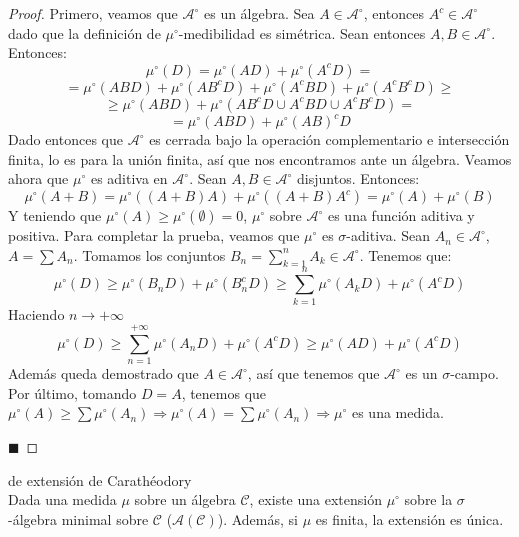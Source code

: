 \documentclass[12pt,a4paper]{book}
\newcommand*{\qed}{\hfill\ensuremath{\blacksquare}}
\begin{document}
\begin{proof}
Primero, veamos que $\mathcal{A}^\circ$ es un álgebra. Sea $A \in \mathcal{A}^\circ$, entonces $A^c \in \mathcal{A}^\circ$ dado que la definición de $\mu^\circ$-medibilidad es simétrica. Sean entonces $A,B \in \mathcal{A}^\circ$. Entonces:
$$ \mu^\circ(D) = \mu^\circ(AD) + \mu^\circ(A^cD) = $$
$$ = \mu^\circ(ABD) + \mu^\circ(AB^cD) + \mu^\circ(A^cBD) + \mu^\circ(A^cB^cD) \geq$$
$$ \geq \mu^\circ(ABD) + \mu^\circ (AB^cD \cup A^cBD \cup A^cB^cD) =$$
$$ = \mu^\circ(ABD) + \mu^\circ(AB)^cD$$
Dado entonces que $\mathcal{A}^\circ$ es cerrada bajo la operación complementario e intersección finita, lo es para la unión finita, así que nos encontramos ante un álgebra. Veamos ahora que $\mu^\circ$ es aditiva en $\mathcal{A}^\circ$. Sean $A,B \in \mathcal{A}^\circ$ disjuntos. Entonces:
$$\mu^\circ(A+B) = \mu^\circ((A+B)A) + \mu^\circ((A+B)A^c) = \mu^\circ(A) + \mu^\circ(B)$$
Y teniendo que $\mu^\circ(A) \geq \mu^\circ(\emptyset) = 0$, $\mu^\circ$ sobre $\mathcal{A}^\circ$ es una función aditiva y positiva. Para completar la prueba, veamos que $\mu^\circ$ es $\sigma$-aditiva. Sean $A_n \in \mathcal{A}^\circ$, $A = \displaystyle \sum A_n$. Tomamos los conjuntos $B_n = \displaystyle \sum_{k=1}^n A_k \in \mathcal{A}^\circ$. Tenemos que:
$$ \mu^\circ(D) \geq \mu^\circ (B_nD) + \mu^\circ (B_n^cD) \geq \sum_{k=1}^n\mu^\circ(A_kD) + \mu^\circ(A^cD) $$
Haciendo $n \to +\infty$
$$\mu^\circ(D) \geq \sum_{n=1}^{+\infty} \mu^\circ(A_nD) + \mu^\circ(A^cD) \geq \mu^\circ(AD) + \mu^\circ(A^cD)$$
Además queda demostrado que $A \in \mathcal{A}^\circ$, así que tenemos que $\mathcal{A}^\circ$ es un $\sigma$-campo.
Por último, tomando $D = A$, tenemos que $\mu^\circ(A) \geq \displaystyle \sum \mu^\circ(A_n) \Rightarrow \mu^\circ(A) = \sum \mu^\circ(A_n) \Rightarrow \mu^\circ$ es una medida.

\qed
\end{proof}

\begin{theorem}
de extensión de Carathéodory\\
Dada una medida $\mu$ sobre un álgebra $\mathcal{C}$, existe una extensión $\mu^\circ$ sobre la $\sigma$-álgebra minimal sobre $\mathcal{C}$ ($\mathcal{A}(\mathcal{C})$). Además, si $\mu$ es finita, la extensión es única.
\end{theorem}
\end{document}
